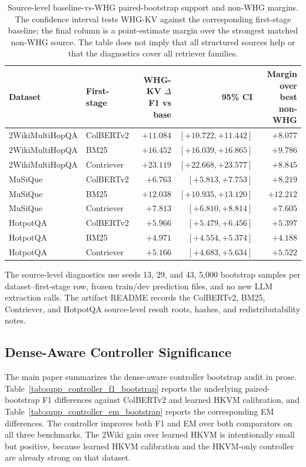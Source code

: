 \documentclass[conference]{IEEEtran}
\begin{document}
\begin{table}[t]
\caption{Source-level baseline-vs-WHG paired-bootstrap support and non-WHG margins. The confidence interval tests WHG-KV against the corresponding first-stage baseline; the final column is a point-estimate margin over the strongest matched non-WHG source. The table does not imply that all structured sources help or that the diagnostics cover all retriever families.}
\label{tab:supp_source_level_bootstrap}
\centering
\small
\setlength{\tabcolsep}{4pt}
\begin{tabular}{llrrr}
\toprule
Dataset & First-stage & WHG-KV $\Delta$F1 vs base & 95\% CI & Margin over best non-WHG \\
\midrule
2WikiMultiHopQA & ColBERTv2 & $+11.084$ & $[+10.722,+11.442]$ & $+8.077$ \\
2WikiMultiHopQA & BM25 & $+16.452$ & $[+16.039,+16.865]$ & $+9.786$ \\
2WikiMultiHopQA & Contriever & $+23.119$ & $[+22.668,+23.577]$ & $+8.845$ \\
MuSiQue & ColBERTv2 & $+6.763$ & $[+5.813,+7.753]$ & $+8.219$ \\
MuSiQue & BM25 & $+12.038$ & $[+10.935,+13.120]$ & $+12.212$ \\
MuSiQue & Contriever & $+7.813$ & $[+6.810,+8.814]$ & $+7.605$ \\
HotpotQA & ColBERTv2 & $+5.966$ & $[+5.479,+6.456]$ & $+5.397$ \\
HotpotQA & BM25 & $+4.971$ & $[+4.554,+5.374]$ & $+4.188$ \\
HotpotQA & Contriever & $+5.166$ & $[+4.683,+5.634]$ & $+5.522$ \\
\bottomrule
\end{tabular}
\end{table}

The source-level diagnostics use seeds 13, 29, and 43, 5,000 bootstrap samples per dataset--first-stage row, frozen train/dev prediction files, and no new LLM extraction calls. The artifact README records the ColBERTv2, BM25, Contriever, and HotpotQA source-level result roots, hashes, and redistributability notes.

\subsection{Dense-Aware Controller Significance}

The main paper summarizes the dense-aware controller bootstrap audit in prose. Table~\ref{tab:supp_controller_f1_bootstrap} reports the underlying paired-bootstrap F1 differences against ColBERTv2 and learned HKVM calibration, and Table~\ref{tab:supp_controller_em_bootstrap} reports the corresponding EM differences. The controller improves both F1 and EM over both comparators on all three benchmarks. The 2Wiki gain over learned HKVM is intentionally small but positive, because learned HKVM calibration and the HKVM-only controller are already strong on that dataset.
\end{document}
